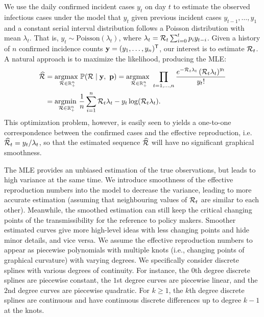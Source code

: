 We use the daily confirmed incident cases $y_t$ on day $t$ to estimate the
observed infectious cases under the model that $y_t$ given previous incident
cases $y_{t-1},\ldots,y_1$ and a constant serial interval distribution follows a
Poisson distribution with mean $\lambda_t$. That is, $y_t \sim
\mathrm{Poisson}(\lambda_t)$, where $\lambda_t =  \mathcal{R}_t\sum_{i=0}^{t}p_i
y_{t-i}$. Given a history of $n$ confirmed incidence counts $\mathbf{y} = (y_1,\ldots,y_n)^{\mathsf{T}}$,
our interest is to estimate $\mathcal{R}_t$. A natural approach is to maximize the
likelihood, producing the MLE:
\begin{equation} \label{eq:mle}
  \begin{split}
    \widehat{\mathcal{R}} &= \underset{\mathcal{R} \in \mathbb{R}_+^n}{\operatorname*{argmax}\ } \mathbb{P}(\mathcal{R} \mid \mathbf{y},\ \mathbf{p})
    = \underset{\mathcal{R} \in \mathbb{R}^n_+}{\operatorname*{argmax}\ } \prod_{t = 1,\dots,n} 
    \frac{e^{- \mathcal{R}_t \lambda_t} \left(\mathcal{R}_t \lambda_t\right)^{y_t} }{y_t!}\\
    &= \underset{\mathcal{R}\in\mathbb{R}^n_+}{\operatorname*{argmin}\ } \frac{1}{n}\sum_{i = 1}^n \mathcal{R}_t\lambda_t - y_t\log(\mathcal{R}_t\lambda_t).
  \end{split}
\end{equation}
This optimization problem, however, is easily seen to yields a one-to-one
correspondence between the confirmed cases and the effective reproduction, i.e.
$\widehat{\mathcal{R}}_t = y_t / \lambda_t$, so that the estimated sequence
$\widehat{\mathcal{R}}$ will have no significant graphical smoothness.

The MLE provides an unbiased estimation of the true observations, but leads to
high variance at the same time. We introduce smoothness of the effective
reproduction numbers into the model to decrease the variance, leading to more
accurate estimation (assuming that neighbouring values of $\mathcal{R}_t$ are
similar to each other).
Meanwhile, the smoothed estimation can still keep the critical changing points
of the transmissibility for the reference to policy makers. 
Smoother estimated curves give more high-level ideas with less changing points
and hide minor details, and vice versa. We assume the effective reproduction
numbers to appear as piecewise polynomials with multiple knots (i.e., changing
points of graphical curvature) with varying degrees. We specifically consider
discrete splines with various degrees of continuity. For instance, the $0$th
degree discrete splines are piecewise constant, the $1$st degree curves are
piecewise linear, and the $2$nd degree curves are piecewise quadratic. For
$k\geq 1$, the $k$th degree discrete splines are continuous and have continuous
discrete differences up to degree $k-1$ at the knots. 

